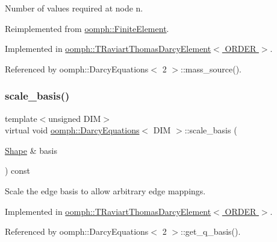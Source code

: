 Number of values required at node n. 



Reimplemented from \hyperlink{classoomph_1_1FiniteElement_a56610c60d5bc2d7c27407a1455471b1a}{oomph\+::\+Finite\+Element}.



Implemented in \hyperlink{classoomph_1_1TRaviartThomasDarcyElement_a35bdfb84cea500e383c72cedfe09f933}{oomph\+::\+T\+Raviart\+Thomas\+Darcy\+Element$<$ O\+R\+D\+E\+R $>$}.



Referenced by oomph\+::\+Darcy\+Equations$<$ 2 $>$\+::mass\+\_\+source().

\mbox{\label{classoomph_1_1DarcyEquations_a2d2b51170939e5804d18d59e2f6b4222}} 
\subsubsection{\texorpdfstring{scale\+\_\+basis()}{scale\_basis()}}
{\footnotesize\ttfamily template$<$unsigned D\+IM$>$ \\
virtual void \hyperlink{classoomph_1_1DarcyEquations}{oomph\+::\+Darcy\+Equations}$<$ D\+IM $>$\+::scale\+\_\+basis (\begin{DoxyParamCaption}\item[{\hyperlink{classoomph_1_1Shape}{Shape} \&}]{basis }\end{DoxyParamCaption}) const\hspace{0.3cm}{\ttfamily [pure virtual]}}



Scale the edge basis to allow arbitrary edge mappings. 



Implemented in \hyperlink{classoomph_1_1TRaviartThomasDarcyElement_aafe56b344166f0c26889247b80fd76c1}{oomph\+::\+T\+Raviart\+Thomas\+Darcy\+Element$<$ O\+R\+D\+E\+R $>$}.



Referenced by oomph\+::\+Darcy\+Equations$<$ 2 $>$\+::get\+\_\+q\+\_\+basis().

\mbox{\label{classoomph_1_1DarcyEquations_adee6b430a8f62190a5cad003c195f52e}} 
